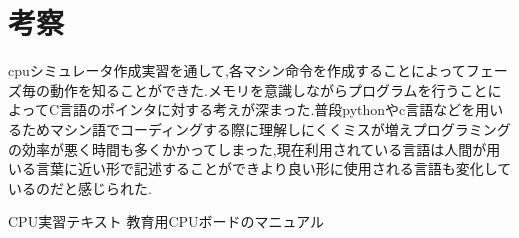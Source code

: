 \documentclass[dvipdfmx]{jsarticle}
\begin{document}
\section{考察}
cpuシミュレータ作成実習を通して,各マシン命令を作成することによってフェーズ毎の動作を知ることができた.メモリを意識しながらプログラムを行うことによってC言語のポインタに対する考えが深まった.普段pythonやc言語などを用いるためマシン語でコーディングする際に理解しにくくミスが増えプログラミングの効率が悪く時間も多くかかってしまった,現在利用されている言語は人間が用いる言葉に近い形で記述することができより良い形に使用される言語も変化しているのだと感じられた.
    \begin{thebibliography}{9}
        CPU実習テキスト
        教育用CPUボードのマニュアル
    \end{thebibliography}
\end{document}

